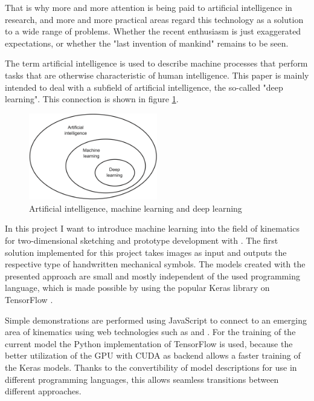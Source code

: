 That is why more and more attention is being paid to artificial intelligence in research, and more and more practical areas regard this technology as a solution to a wide range of problems.
Whether the recent enthusiasm is just exaggerated expectations, or whether the "last invention of mankind" \cite{Good1965} remains to be seen.

The term artificial intelligence is used to describe machine processes that perform tasks that are otherwise characteristic of human intelligence.
This paper is mainly intended to deal with a subfield of artificial intelligence, the so-called "deep learning".
This connection is shown in figure \ref{fig:ai_ml_dl}.

\begin{figure}
    \includegraphics[width=0.5\textwidth]{images/ai_ml_dl.png}
    \caption{Artificial intelligence, machine learning and deep learning \cite[p.4]{Chollet2017}}
    \label{fig:ai_ml_dl}
\end{figure}

In this project I want to introduce machine learning into the field of kinematics for two-dimensional sketching and prototype development with .
The first solution implemented for this project takes images as input and outputs the respective type of handwritten mechanical symbols.
The models created with the presented approach are small and mostly independent of the used programming language, which is made possible by using the popular Keras \cite{Chollet} library on TensorFlow \cite{Google2019}.

Simple demonstrations are performed using JavaScript to connect to an emerging area of kinematics using web technologies such as  \cite{Goessner2019} and  \cite{Uhlig2019}.
For the training of the current model the Python implementation of TensorFlow is used, because the better utilization of the GPU with CUDA \cite{nvidia2019} as backend allows a faster training of the Keras models.
Thanks to the convertibility of model descriptions for use in different programming languages, this allows seamless transitions between different approaches.

